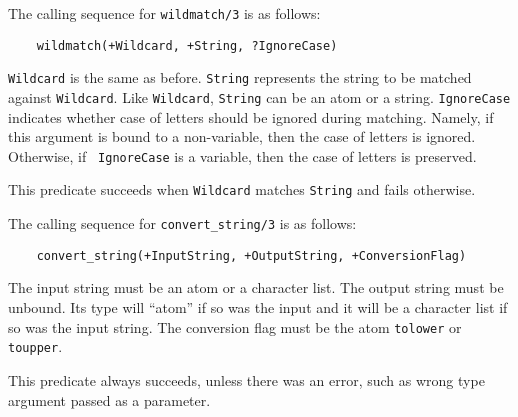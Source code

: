 The calling sequence for {\tt wildmatch/3}  is as follows:
\begin{verbatim}
    wildmatch(+Wildcard, +String, ?IgnoreCase)  
\end{verbatim}
{\tt Wildcard} is the same as before. {\tt String} represents the string to
be matched against {\tt Wildcard}. Like {\tt Wildcard}, {\tt String} can be
an atom or a string. {\tt IgnoreCase} indicates whether case of letters
should be ignored during matching. Namely, if this argument is bound to a
non-variable, then the case of letters is ignored. Otherwise, if {\tt
  IgnoreCase} is a variable, then the case of letters is preserved.

This predicate succeeds when {\tt Wildcard} matches {\tt String} and fails
otherwise.

The calling sequence for {\tt convert_string/3}  is as follows:
\begin{verbatim}
    convert_string(+InputString, +OutputString, +ConversionFlag)  
\end{verbatim}
The input string must be an atom or a character list. The output string
must be unbound. Its type will ``atom'' if so was the input and it will be
a character list if so was the input string. The conversion flag must be
the atom {\tt tolower} or {\tt toupper}. 

This predicate always succeeds, unless there was an error, such as wrong
type argument passed as a parameter.




